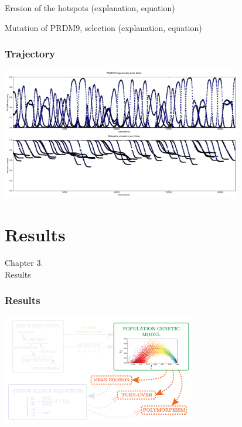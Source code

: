 \documentclass[10pt]{beamer}
\begin{document}
\begin{frame}
	\begin{center}
		\Large
    Erosion of the hotspots (explanation, equation)
	\end{center}
\end{frame}

\begin{frame}
	\begin{center}
		\Large
    Mutation of PRDM9, selection (explanation, equation)
	\end{center}
\end{frame}

\begin{frame}
	\frametitle{Trajectory}
	\begin{center}
       \includegraphics[width=10.5cm]{Images/simulations.png}
	\end{center}
\end{frame}

\section{Results}

\begin{frame}
	\begin{center}
	\huge
	Chapter 3. \\
       Results
	\end{center}
\end{frame}


\begin{frame}
\frametitle{Results}
	\begin{center}
       \includegraphics[width=8.5cm]{Images/overline-3.png}
	\end{center}
\end{frame}
\end{document}
